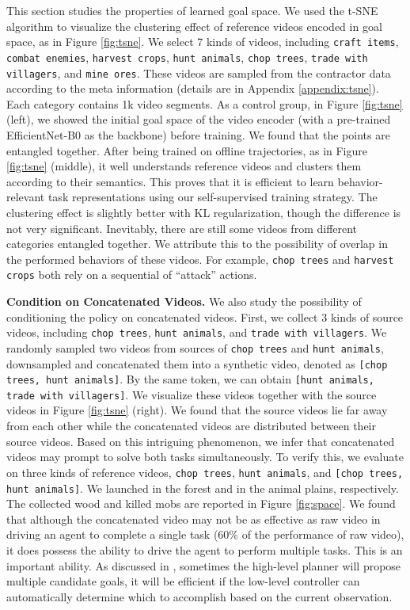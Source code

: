 \documentclass[11pt, a4paper, logo, one column]{craftjarvis}
\begin{document}
This section studies the properties of learned goal space. We used the t-SNE algorithm \citep{tsne} to visualize the clustering effect of reference videos encoded in goal space, as in Figure \ref{fig:tsne}. We select 7 kinds of videos, including \texttt{craft items}, \texttt{combat enemies}, \texttt{harvest crops}, \texttt{hunt animals}, \texttt{chop trees}, \texttt{trade with villagers}, and \texttt{mine ores}. These videos are sampled from the contractor data \citep{vpt} according to the meta information (details are in Appendix \ref{appendix:tsne}). Each category contains 1k video segments. As a control group, in Figure \ref{fig:tsne} (left), we showed the initial goal space of the video encoder (with a pre-trained EfficientNet-B0 \citep{eff} as the backbone) before training. We found that the points are entangled together. After being trained on offline trajectories, as in Figure \ref{fig:tsne} (middle), it well understands reference videos and clusters them according to their semantics. This proves that it is efficient to learn behavior-relevant task representations using our self-supervised training strategy. The clustering effect is slightly better with KL regularization, though the difference is not very significant. Inevitably, there are still some videos from different categories entangled together. We attribute this to the possibility of overlap in the performed behaviors of these videos. For example, \texttt{chop trees} and \texttt{harvest crops} both rely on a sequential of ``attack'' actions. 



\textbf{Condition on Concatenated Videos.} We also study the possibility of conditioning the policy on concatenated videos. First, we collect 3 kinds of source videos, including \texttt{chop trees}, \texttt{hunt animals}, and \texttt{trade with villagers}. We randomly sampled two videos from sources of \texttt{chop trees} and \texttt{hunt animals}, downsampled and concatenated them into a synthetic video, denoted as \texttt{[chop trees, hunt animals]}. By the same token, we can obtain \texttt{[hunt animals, trade with villagers]}. We visualize these videos together with the source videos in Figure \ref{fig:tsne} (right). We found that the source videos lie far away from each other while the concatenated videos are distributed between their source videos. Based on this intriguing phenomenon, we infer that concatenated videos may prompt \agent to solve both tasks simultaneously. To verify this, we evaluate \agent on three kinds of reference videos, \ie \texttt{chop trees}, \texttt{hunt animals}, and \texttt{[chop trees, hunt animals]}. We launched \agent in the forest and in the animal plains, respectively. The collected wood and killed mobs are reported in Figure \ref{fig:space}. We found that although the concatenated video may not be as effective as raw video in driving an agent to complete a single task ($60\%$ of the performance of raw video), it does possess the ability to drive the agent to perform multiple tasks. This is an important ability. As discussed in \cite{deps}, sometimes the high-level planner will propose multiple candidate goals, it will be efficient if the low-level controller can automatically determine which to accomplish based on the current observation. 
\end{document}
